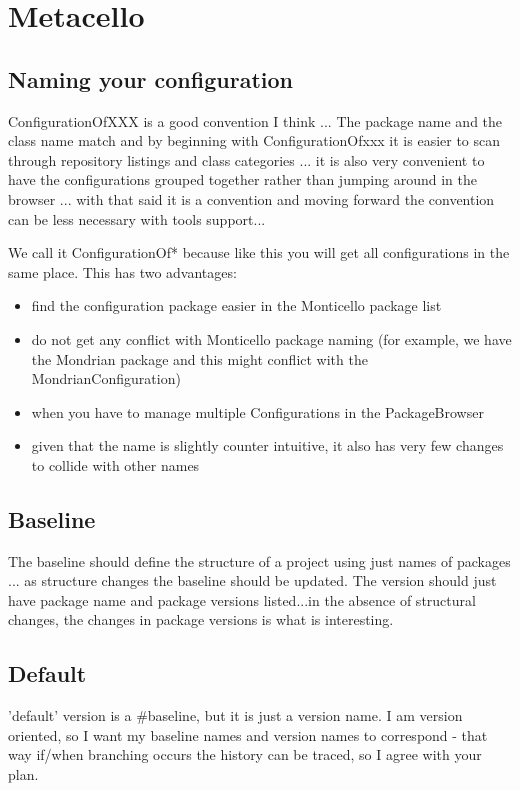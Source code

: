 \documentclass[a4paper,10pt,twoside]{book}
\begin{document}
	\sloppy
\fi
\chapter{Metacello}

\section{Naming your configuration}
ConfigurationOfXXX is a good convention I think ... The package name and the class name match and by beginning with ConfigurationOfxxx it is easier to scan through repository listings and class categories ... it is also very convenient to have the configurations grouped together rather than jumping around in the browser ... with that said it is a convention and moving forward the convention can be less necessary with tools support... 

We call it ConfigurationOf* because like this you will get all configurations in the same place. This has two advantages:
\begin{itemize}
\item find the configuration package easier in the Monticello package list
\item do not get any conflict with Monticello package naming (for example, we have the Mondrian package and this might conflict with the MondrianConfiguration)
\item when you have to manage multiple Configurations in the PackageBrowser
\item  given that the name is slightly counter intuitive, it also has very few changes to collide with other names
\end{itemize}

\section{Baseline}
  
  The baseline should define the structure of a project using just
  names of packages ... as structure changes the baseline should be
  updated. The version should just have package name and package
  versions listed...in the absence of structural changes, the changes in
  package versions is what is interesting.


\section{Default}
 'default' version is a \#baseline, but it is just a version
 name. I am version oriented, so I want my baseline names and version
 names to correspond - that way if/when branching occurs the history
 can be traced, so I agree with your plan. 
\end{document}
